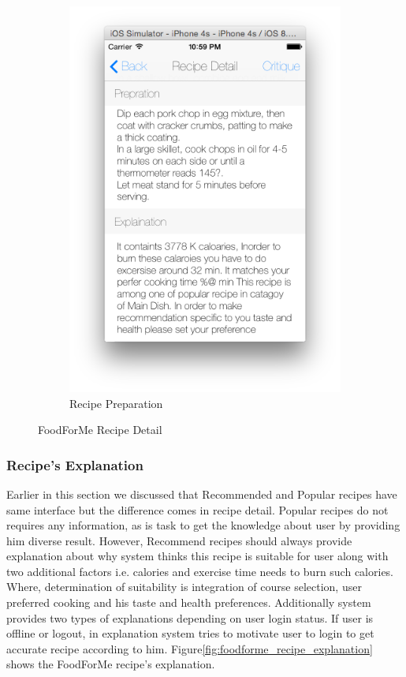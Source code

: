 \begin{figure}[h]
\begin{subfigure}{.32\textwidth}
	  		\includegraphics[width=.9\linewidth]{figures/ch4_app_screen_shots/recipe_detail/recipe_detail_3.png}
	  		\caption{Recipe Preparation}
		  	\end{subfigure}
	  	\caption{FoodForMe Recipe Detail}
	  	\label{fig:foodforme_recipe_detail_screens}
	  \end{figure}

\newpage
\subsubsection{Recipe's Explanation}

Earlier in this section we discussed that Recommended and Popular recipes have same interface but the difference comes in recipe detail. Popular recipes do not requires any information, as is task to get the knowledge about user by providing him diverse result. However, Recommend recipes should always provide explanation about why system thinks this recipe is suitable for user along with two additional factors i.e. calories and exercise time needs to burn such calories. Where, determination of suitability is integration of course selection, user preferred cooking and his taste and health preferences. Additionally system provides two types of explanations depending on user login status. If user is offline or logout, in explanation system tries to motivate user to login to get accurate recipe according to him. Figure\ref{fig:foodforme_recipe_explanation} shows the FoodForMe recipe's explanation.  


